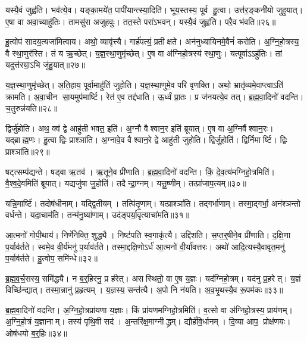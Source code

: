 यस्यै॒वं जुह्व॑ति।
भव॑त्ये॒व।
यङ्का॒मये॑त॒ पापी॑यान्त्स्या॒दिति॑।
भूय॒स्तस्य॒ पूर्व हु॒त्वा।
उत्त॑र॒ङ्कनी॑यो जुहुयात्।
ए॒षा वा अवा॒च्याहु॑तिः।
तामसु॑रा अजुहवुः।
तत॒स्ते परा॑ऽभवन्।
यस्यै॒वं जुह्व॑ति।
परै॒व भ॑वति॥२६॥

हु॒त्वोप॑ सादय॒त्यजा॑मित्वाय।
अथो॒ व्यावृ॑त्त्यै।
गार्\mbox{}ह॑पत्यं॒ प्रतीक्षते।
अन॑नुध्यायिनमे॒वैनं॑ करोति।
अ॒ग्नि॒हो॒त्रस्य॒ वै स्था॒णुर॑स्ति।
तं य ऋ॒च्छेत्।
य॒ज्ञ॒स्था॒णुमृ॑च्छेत्।
ए॒ष वा अ॑ग्निहो॒त्रस्य॑ स्था॒णुः।
यत्पूर्वाऽऽहु॑तिः।
तां यदुत्त॑रया॒ऽभि जु॑हु॒यात्॥२७॥

य॒ज्ञ॒स्था॒णुमृ॑च्छेत्।
अ॒ति॒हाय॒ पूर्वा॒माहु॑तिं जुहोति।
य॒ज्ञ॒स्था॒णुमे॒व परि॑ वृणक्ति।
अथो॒ भ्रातृ॑व्यमे॒वाप्त्वाऽति॑ क्रामति।
अ॒वा॒चीन सा॒यमुप॑मार्ष्टि।
रेत॑ ए॒व तद्द॑धाति।
ऊ॒र्ध्वं प्रा॒तः।
प्र ज॑नयत्ये॒व तत्।
ब्र॒ह्म॒वा॒दिनो॑ वदन्ति।
च॒तुरुन्न॑यति॥२८॥

द्विर्जु॑होति।
अथ॒ क्व॑ द्वे आहु॑ती भवत॒ इति॑।
अ॒ग्नौ वैश्वान॒र इति॑ ब्रूयात्।
ए॒ष वा अ॒ग्निर्वैश्वान॒रः।
यद्ब्राह्म॒णः।
हु॒त्वा द्विः प्राश्ञा॑ति।
अ॒ग्नावे॒व वैश्वान॒रे द्वे आहु॑ती जुहोति।
द्विर्जु॒होति॑।
द्विर्निमार्ष्टि।
द्विः प्राश्ञा॑ति॥२९॥

षट्त्सम्प॑द्यन्ते।
षड्वा ऋ॒तव॑।
ऋ॒तूने॒व प्री॑णाति।
ब्र॒ह्म॒वा॒दिनो॑ वदन्ति।
किं॒ दे॒व॒त्य॑मग्निहो॒त्रमिति॑।
वै॒श्व॒दे॒वमिति॑ ब्रूयात्।
यद्यजु॑षा जु॒होति॑।
तदैन्द्रा॒ग्नम्।
यत्तू॒ष्णीम्।
तत्प्रा॑जाप॒त्यम्॥३०॥

यन्नि॒मार्ष्टि॑।
तदोष॑धीनाम्।
यद्द्वि॒तीयम्।
तत्पि॑तृ॒णाम्।
यत्प्राश्ञा॑ति।
तद्गर्भा॑णाम्।
तस्मा॒द्गर्भा॒ अन॑श्ञन्तो वर्धन्ते।
यदा॒चाम॑ति।
तन्म॑नु॒ष्या॑णाम्।
उद॑ङ्पर्या॒वृत्याचा॑मति॥३१॥

आ॒त्मनो॑ गोपी॒थाय॑।
निर्णे॑नेक्ति॒ शुद्ध्यै।
निष्ट॑पति स्व॒गाकृ॑त्यै।
उद्दि॑शति।
स॒प्त॒र्॒षीने॒व प्री॑णाति।
द॒क्षि॒णा प॒र्याव॑र्तते।
स्वमे॒व वी॒र्य॑मनु॑ प॒र्याव॑र्तते।
तस्मा॒द्दक्षि॒णोऽर्ध॑ आ॒त्मनो॑ वी॒र्या॑वत्तरः।
अथो॑ आदि॒त्यस्यै॒वावृत॒मनु॑ प॒र्याव॑र्तते।
हु॒त्वोप॒ समि॑न्धे॥३२॥

ब्र॒ह्म॒व॒र्च॒सस्य॒ समि॑द्ध्यै।
न ब॒र्॒हिरनु॒ प्र ह॑रेत्।
असस्थितो॒ वा ए॒ष य॒ज्ञः।
यद॑ग्निहो॒त्रम्।
यद॑नु प्र॒हरेत्।
य॒ज्ञं विच्छि॑न्द्यात्।
तस्मा॒न्नानु॑ प्र॒हृत्यम्।
य॒ज्ञस्य॒ सन्त॑त्यै।
अ॒पो नि न॑यति।
अ॒व॒भृ॒थस्यै॒व रू॒पम॑कः॥३३॥\anuvakamend[अ॒भ॒व॒न्भ॒व॒ति॒ जु॒हु॒यान्न॑यति मार्ष्टि॒ द्विः प्राश्ञा॑ति प्राजाप॒त्यमाचा॑मतीन्धेऽकः]

ब्र॒ह्म॒वा॒दिनो॑ वदन्ति।
अ॒ग्नि॒हो॒त्रप्रा॑यणा य॒ज्ञाः।
किं प्रा॑यणमग्निहो॒त्रमिति॑।
व॒त्सो वा अ॑ग्निहो॒त्रस्य॒ प्राय॑णम्।
अ॒ग्नि॒हो॒त्रं य॒ज्ञानाम्।
तस्य॑ पृथि॒वी सद॑।
अ॒न्तरि॑क्ष॒माग्नीद्ध्रम्।
द्यौर्\mbox{}ह॑वि॒र्धानम्।
दि॒व्या आप॒ प्रोक्ष॑णयः।
ओष॑धयो ब॒र्॒हिः॥३४॥

